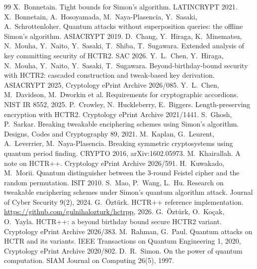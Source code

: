 \documentclass[11pt]{article}
\theoremstyle{definition}
\theoremstyle{remark}
\begin{document}
\begin{thebibliography}{99}
 X.~Bonnetain. Tight bounds for Simon's algorithm. LATINCRYPT 2021.
 X.~Bonnetain, A.~Hosoyamada, M.~Naya-Plasencia, Y.~Sasaki, A.~Schrottenloher. Quantum attacks without superposition queries: the offline Simon's algorithm. ASIACRYPT 2019.
 D.~Chang, Y.~Hiraga, K.~Minematsu, N.~Mouha, Y.~Naito, Y.~Sasaki, T.~Shiba, T.~Sugawara. Extended analysis of key committing security of HCTR2. SAC 2026.
 Y.~L.~Chen, Y.~Hiraga, N.~Mouha, Y.~Naito, Y.~Sasaki, T.~Sugawara. Beyond-birthday-bound security with HCTR2: cascaded construction and tweak-based key derivation. ASIACRYPT 2025, Cryptology ePrint Archive 2026/085.
 Y.~L.~Chen, M.~Davidson, M.~Dworkin et al. Requirements for cryptographic accordions. NIST IR 8552, 2025.
 P.~Crowley, N.~Huckleberry, E.~Biggers. Length-preserving encryption with HCTR2. Cryptology ePrint Archive 2021/1441.
 S.~Ghosh, P.~Sarkar. Breaking tweakable enciphering schemes using Simon's algorithm. Designs, Codes and Cryptography 89, 2021.
 M.~Kaplan, G.~Leurent, A.~Leverrier, M.~Naya-Plasencia. Breaking symmetric cryptosystems using quantum period finding. CRYPTO 2016, arXiv:1602.05973.
 M.~Khairallah. A note on HCTR++. Cryptology ePrint Archive 2026/591.
 H.~Kuwakado, M.~Morii. Quantum distinguisher between the 3-round Feistel cipher and the random permutation. ISIT 2010.
 S.~Mao, P.~Wang, L.~Hu. Research on tweakable enciphering schemes under Simon's quantum algorithm attack. Journal of Cyber Security 9(2), 2024.
 G.~\"Ozt\"urk. HCTR++ reference implementation. \url{https://github.com/gulnihalozturk/hctrpp}, 2026.
 G.~\"Ozt\"urk, O.~Ko\c{c}ak, O.~Yayla. HCTR++: a beyond birthday bound secure HCTR2 variant. Cryptology ePrint Archive 2026/383.
 M.~Rahman, G.~Paul. Quantum attacks on HCTR and its variants. IEEE Transactions on Quantum Engineering 1, 2020, Cryptology ePrint Archive 2020/802.
 D.~R.~Simon. On the power of quantum computation. SIAM Journal on Computing 26(5), 1997.
\end{thebibliography}
\end{document}
